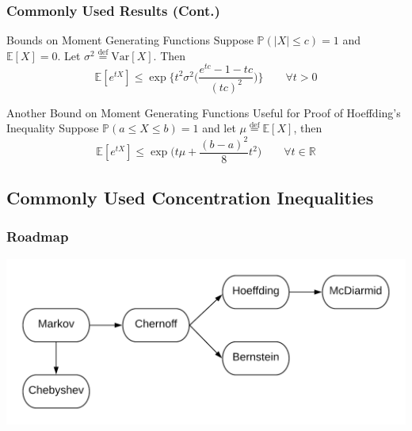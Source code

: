 \documentclass{beamer}
\begin{document}

\begin{frame}
\frametitle{Commonly Used Results (Cont.)} 

\begin{block}{Bounds on Moment Generating Functions}
Suppose $\mathbb{P}(|X| \leq c) = 1$ and $\mathbb{E}[X] = 0$. Let $ \sigma^2 \stackrel{\text{def}}{=} \text{Var}[X] $. Then $$ \mathbb{E}[e^{tX}] \leq \exp \bigg\{ t^2 \sigma^2 \bigg( \frac{e^{tc} - 1 - tc}{(tc)^2} \bigg) \bigg\} \qquad \forall t > 0 $$
\end{block}

\begin{block}{Another Bound on Moment Generating Functions Useful for Proof of Hoeffding's Inequality}
Suppose $\mathbb{P}(a \leq X \leq b) = 1$ and let $\mu \stackrel{\text{def}}{=} \mathbb{E}[X]$, then 
$$ \mathbb{E}[e^{tX}] \leq \exp \bigg( t\mu + \frac{(b-a)^2}{8} t^2 \bigg) \qquad \forall t \in \mathbb{R}$$
\end{block}

\end{frame}


\subsection{Commonly Used Concentration Inequalities} 
\begin{frame}
\frametitle{Roadmap} 

\includegraphics[width=\textwidth]{roadmap.png}

\end{frame}

\end{document}
